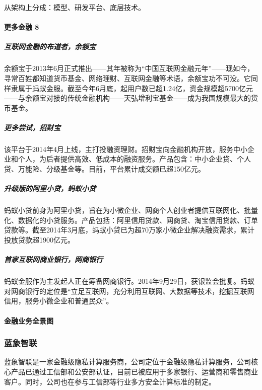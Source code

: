 \documentclass[letterpaper,10pt,english]{sphinxmanual}
\begin{document}
从架构上分成：模型、研发平台、底层技术。


\paragraph{更多金融 8\sphinxfootnotemark[998]}
\label{\detokenize{chapter_AI_company/alipay:id12}}%
\begin{footnotetext}[998]\sphinxAtStartFootnote
{}
%
\end{footnotetext}\ignorespaces 

\subparagraph{互联网金融的布道者，余额宝}
\label{\detokenize{chapter_AI_company/alipay:id13}}
余额宝于2013年6月正式推出——其年被称为“中国互联网金融元年”——现如今，寻常百姓都知道货币基金、网络理财、互联网金融等术语，余额宝功不可没。它同样隶属于蚂蚁金服。截至今年6月底，起用户数已超1.24亿，资金规模超5700亿元——与余额宝对接的传统金融机构——天弘增利宝基金——成为我国规模最大的货币基金。


\subparagraph{更多尝试，招财宝}
\label{\detokenize{chapter_AI_company/alipay:id14}}
该平台于2014年4月上线，主打投融资理财。招财宝向金融机构开放，服务中小企业和个人，为后者提供高效、低成本的融资服务。产品包含：中小企业贷、个人贷、万能险、分级基金等。目前，平台累计成交额已超150亿元。


\subparagraph{升级版的阿里小贷，蚂蚁小贷}
\label{\detokenize{chapter_AI_company/alipay:id15}}
蚂蚁小贷前身为阿里小贷，旨在为小微企业、网商个人创业者提供互联网化、批量化、数据化的小贷服务。产品包括：阿里信用贷款、网商贷、淘宝信用贷款、订单贷款等。截至2014年3月底，蚂蚁小贷已为超70万家小微企业解决融资需求，累计投放贷款超1900亿元。


\subparagraph{首家互联网商业银行，网商银行}
\label{\detokenize{chapter_AI_company/alipay:id16}}
蚂蚁金服作为主发起人正在筹备网商银行。2014年9月29日，获银监会批复。蚂蚁对网商银行的定位是“立足互联网，充分利用互联网、大数据等技术，挖掘互联网信用，服务小微企业和普通民众”。


\paragraph{金融业务全景图}
\label{\detokenize{chapter_AI_company/alipay:id17}}


\subsubsection{蓝象智联}
\label{\detokenize{chapter_AI_company/trustbe:id1}}\label{\detokenize{chapter_AI_company/trustbe::doc}}
蓝象智联是一家金融级隐私计算服务商，公司定位于金融级隐私计算服务，公司核心产品已通过工信部和公安部认证，目前已被应用于多家银行、运营商和零售商业客户。同时，公司也在参与工信部等行业多方安全计算标准的制定。%
\begin{footnote}[999]\sphinxAtStartFootnote
{}
%
\end{footnote}
\end{document}
